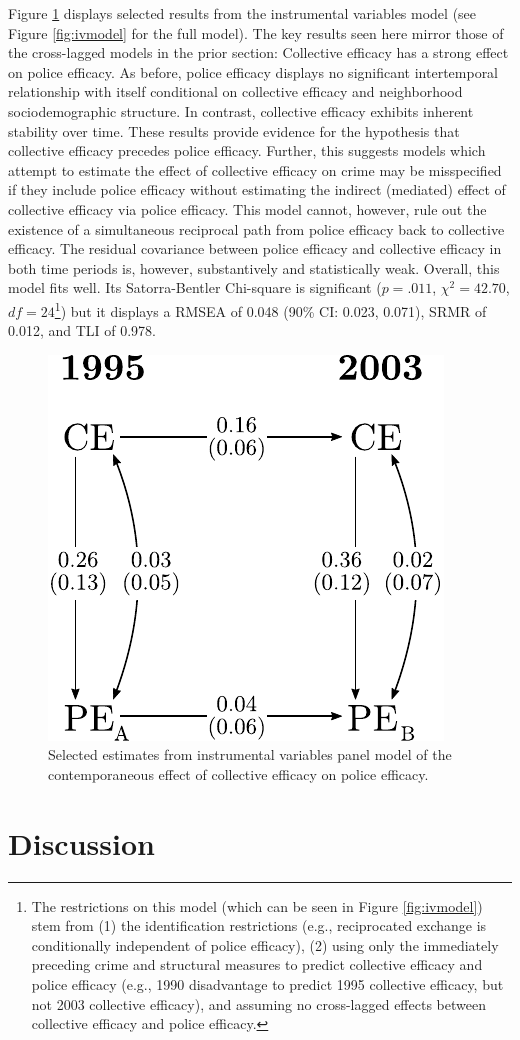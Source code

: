 \documentclass [11pt, proquest] {uwthesis}[2015/03/03]
\begin{document}
Figure \ref{fig:ivresults} displays selected results from the instrumental variables model (see Figure \ref{fig:ivmodel} for the full model). The key results seen here mirror those of the cross-lagged models in the prior section: Collective efficacy has a strong effect on police efficacy. As before, police efficacy displays no significant intertemporal relationship with itself conditional on collective efficacy and neighborhood sociodemographic structure. In contrast, collective efficacy exhibits inherent stability over time. These results provide evidence for the hypothesis that collective efficacy precedes police efficacy. Further, this suggests models which attempt to estimate the effect of collective efficacy on crime may be misspecified if they include police efficacy without estimating the indirect (mediated) effect of collective efficacy via police efficacy. This model cannot, however, rule out the existence of a simultaneous reciprocal path from police efficacy back to collective efficacy. The residual covariance between police efficacy and collective efficacy in both time periods is, however, substantively and statistically weak. Overall, this model fits well. Its Satorra-Bentler Chi-square is significant (\(p =.011\), \(\chi^{2}=42.70\), \(df = 24\)\footnote{The restrictions on this model (which can be seen in Figure \ref{fig:ivmodel}) stem from (1) the identification restrictions (e.g., reciprocated exchange is conditionally independent of police efficacy), (2) using only the immediately preceding crime and structural measures to predict collective efficacy and police efficacy (e.g., 1990 disadvantage to predict 1995 collective efficacy, but not 2003 collective efficacy), and assuming no cross-lagged effects between collective efficacy and police efficacy.}) but it displays a RMSEA of 0.048 (90\% CI: 0.023, 0.071), SRMR of 0.012, and TLI of 0.978.\linebreak
\linebreak
\begin{figure}

{\centering \includegraphics[width=0.5\linewidth]{./figure/ch3/iv_model_results} 

}

\caption{Selected estimates from instrumental variables panel model of the contemporaneous effect of collective efficacy on police efficacy.}\label{fig:ivresults}
\end{figure}
\hypertarget{discussion-1}{%
\section{Discussion}\label{discussion-1}}
\end{document}
